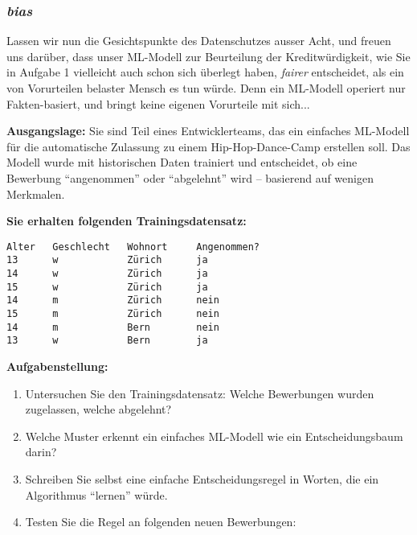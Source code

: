 \begin{lpu}
\begin{aufgabe}{5}
\end{aufgabe}


\subsubsection*{\textit{bias}}
Lassen wir nun die Gesichtspunkte des Datenschutzes ausser Acht, und freuen uns darüber, dass unser ML-Modell zur Beurteilung der Kreditwürdigkeit, wie Sie in Aufgabe 1 vielleicht auch schon sich überlegt haben, \textit{fairer} entscheidet, als ein von Vorurteilen belaster Mensch es tun würde. Denn ein ML-Modell operiert nur Fakten-basiert, und bringt keine eigenen Vorurteile mit sich...

\begin{aufgabe}{6}

\textbf{Ausgangslage:}  
Sie sind Teil eines Entwicklerteams, das ein einfaches ML-Modell für die automatische Zulassung zu einem Hip-Hop-Dance-Camp erstellen soll. Das Modell wurde mit historischen Daten trainiert und entscheidet, ob eine Bewerbung ``angenommen'' oder ``abgelehnt'' wird – basierend auf wenigen Merkmalen.

\vspace{0.5em}
\textbf{Sie erhalten folgenden Trainingsdatensatz:}

\begin{centering}
\begin{verbatim}
Alter   Geschlecht   Wohnort     Angenommen?
13      w            Zürich      ja
14      w            Zürich      ja
15      w            Zürich      ja
14      m            Zürich      nein
15      m            Zürich      nein
14      m            Bern        nein
13      w            Bern        ja
\end{verbatim}
\end{centering}

\vspace{0.5em}
\textbf{Aufgabenstellung:}

\begin{enumerate}
  \item Untersuchen Sie den Trainingsdatensatz: Welche Bewerbungen wurden zugelassen, welche abgelehnt?
  \item Welche Muster erkennt ein einfaches ML-Modell wie ein Entscheidungsbaum darin?
  \item Schreiben Sie selbst eine einfache Entscheidungsregel in Worten, die ein Algorithmus ``lernen'' würde.
  \item Testen Sie die Regel an folgenden neuen Bewerbungen:
  

\end{enumerate}
\end{aufgabe}
\end{lpu}
